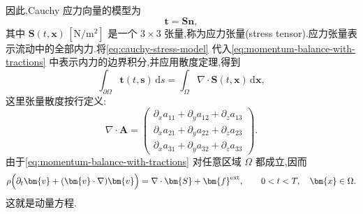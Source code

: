 \begin{note}
因此,Cauchy 应力向量的模型为
\begin{equation}\label{eq:cauchy-stress-model}
  \bm{t}=\bm{S}\bm{n},
\end{equation}
其中 $\bm{S}(t,\bm{x})\,[\mathrm{N}/\mathrm{m}^2]$ 是一个 $3\times3$ 张量,称为应力张量(stress tensor).应力张量表示流动中的全部内力.将\cref{eq:cauchy-stress-model} 代入\cref{eq:momentum-balance-with-tractions} 中表示内力的边界积分,并应用散度定理,得到
\begin{equation*}
  \int_{\partial\Omega}\bm{t}(t,\bm{s})\,\mathrm{d}s
  =\int_{\Omega}\nabla\cdot\bm{S}(t,\bm{x})\,\mathrm{d}\bm{x},
\end{equation*}
这里张量散度按行定义:
\begin{equation*}
  \nabla\cdot\bm{A}
  =\begin{pmatrix}
    \partial_x a_{11}+\partial_y a_{12}+\partial_z a_{13}\\
    \partial_x a_{21}+\partial_y a_{22}+\partial_z a_{23}\\
    \partial_x a_{31}+\partial_y a_{32}+\partial_z a_{33}
  \end{pmatrix}.
\end{equation*}
由于\cref{eq:momentum-balance-with-tractions} 对任意区域 $\Omega$ 都成立,因而
\begin{equation}\label{eq:momentum-equation}
  \rho\Bigl(\partial_t\bm{v}+(\bm{v}\cdot\nabla)\bm{v}\Bigr)
  =\nabla\cdot\bm{S}+\bm{f}^{\mathrm{ext}},
  \qquad 0<t<T,\quad\bm{x}\in\Omega.
\end{equation}
这就是动量方程.
\end{note}

